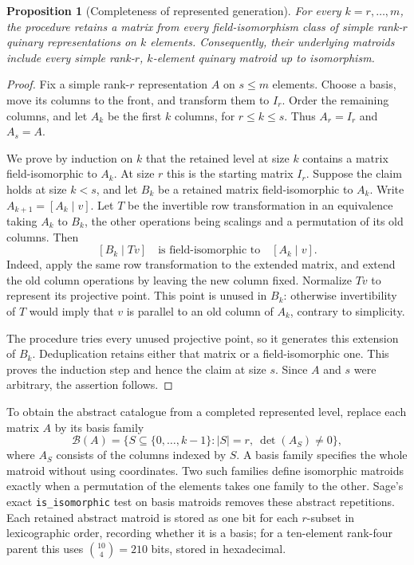 \documentclass[11pt,a4paper]{article}
\newtheorem{proposition}[theorem]{Proposition}
\theoremstyle{definition}
\newcommand{\B}{\mathcal B}
\begin{document}
\begin{proposition}[Completeness of represented generation]\label{prop:generation}
For every $k=r,\ldots,m$, the procedure retains a matrix from every
field-isomorphism class of simple rank-$r$ quinary representations
on $k$ elements. Consequently, their underlying matroids include
every simple rank-$r$, $k$-element quinary matroid up to isomorphism.
\end{proposition}
\begin{proof}
Fix a simple rank-$r$ representation $A$ on $s\leq m$ elements.
Choose a basis, move its columns to the front, and transform them
to $I_r$. Order the remaining columns, and let $A_k$ be the first
$k$ columns, for $r\leq k\leq s$. Thus $A_r=I_r$ and $A_s=A$.

We prove by induction on $k$ that the retained level at size $k$
contains a matrix field-isomorphic to $A_k$. At size $r$ this is
the starting matrix $I_r$. Suppose the claim holds at size $k<s$,
and let $B_k$ be a retained matrix field-isomorphic to $A_k$.
Write $A_{k+1}=[A_k\mid v]$. Let $T$ be the invertible row
transformation in an equivalence taking $A_k$ to $B_k$, the other
operations being scalings and a permutation of its old columns.
Then
\[
 [B_k\mid Tv]\quad\text{is field-isomorphic to}\quad[A_k\mid v].
\]
Indeed, apply the same row transformation to the extended matrix,
and extend the old column operations by leaving the new column
fixed. Normalize $Tv$ to represent its projective point. This
point is unused in $B_k$: otherwise invertibility of $T$ would
imply that $v$ is parallel to an old column of $A_k$, contrary to
simplicity.

The procedure tries every unused projective point, so it generates
this extension of $B_k$. Deduplication retains either that matrix
or a field-isomorphic one. This proves the induction step and hence
the claim at size $s$. Since $A$ and $s$ were arbitrary, the
assertion follows.
\end{proof}

To obtain the abstract catalogue from a completed represented level,
replace each matrix $A$ by its basis family
\[
 \B(A)=\{S\subseteq\{0,\ldots,k-1\}:|S|=r,\ \det(A_S)\neq0\},
\]
where $A_S$ consists of the columns indexed by $S$. A basis family
specifies the whole matroid without using coordinates. Two such
families define isomorphic matroids exactly when a permutation of
the elements takes one family to the other. Sage's exact
\texttt{is\_isomorphic} test on basis matroids removes these abstract
repetitions.
Each retained abstract matroid is stored as one bit for each
$r$-subset in lexicographic order, recording whether it is a basis;
for a ten-element rank-four parent this uses $\binom{10}{4}=210$
bits, stored in hexadecimal.
\end{document}
